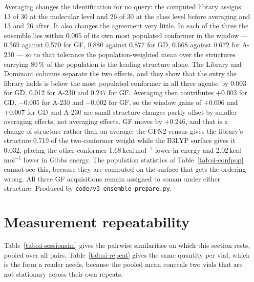 \documentclass[11pt]{article}
\begin{document}
\begin{table}[htbp]
\begin{flushleft}\footnotesize Averaging changes the identification for no query: the computed library assigns 13 of 30 at the molecular level and 26 of 30 at the class level before averaging and 13 and 26 after. It also changes the agreement very little. In each of the three the ensemble lies within 0.005 of its own most populated conformer in the window --- 0.569 against 0.570 for GF, 0.880 against 0.877 for GD, 0.668 against 0.672 for A-230 --- so to that tolerance the population-weighted mean over the structures carrying 80\,\% of the population is the leading structure alone. The Library and Dominant columns separate the two effects, and they show that the entry the library holds is below the most populated conformer in all three agents: by 0.003 for GD, 0.012 for A-230 and 0.247 for GF. Averaging then contributes +0.003 for GD, $-$0.005 for A-230 and $-$0.002 for GF, so the window gains of +0.006 and +0.007 for GD and A-230 are small structure changes partly offset by smaller averaging effects, not averaging effects. GF moves by +0.246, and that is a change of structure rather than an average: the GFN2 census gives the library's structure 0.719 of the two-conformer weight while the B3LYP surface gives it 0.032, placing the other conformer 1.68\,kcal\,mol$^{-1}$ lower in energy and 2.02\,kcal\,mol$^{-1}$ lower in Gibbs energy. The population statistics of Table~\ref{tab:si-confpop} cannot see this, because they are computed on the surface that gets the ordering wrong. All three GF acquisitions remain assigned to soman under either structure. Produced by \texttt{code/v3\_ensemble\_prepare.py}.\end{flushleft}
\end{table}
\clearpage

\section{Measurement repeatability}
\label{si:repeat}

Table~\ref{tab:si-sessionsim} gives the pairwise similarities on which this section
rests, pooled over all pairs. Table~\ref{tab:si-repeat} gives the same quantity per vial,
which is the form a reader needs, because the pooled mean conceals two vials that are not
stationary across their own repeats.
\end{document}
